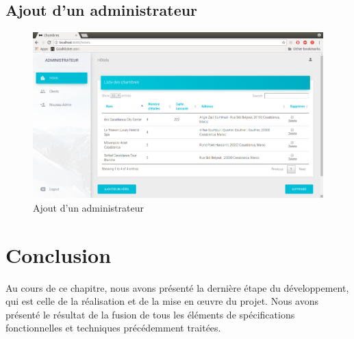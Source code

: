 \documentclass[12pt,a4paper]{report}
\begin{document}
	\subsection{Ajout d'un administrateur}
	\begin{figure}[!hbtp]
		\centering
		\includegraphics[scale=0.3]{./graphics/hotels.png}
		\caption{Ajout d'un administrateur}
		\end{figure}
		\newpage
	
	\section{Conclusion}
Au cours de ce chapitre, nous avons présenté la dernière étape du développement, qui est
celle de la réalisation et de la mise en œuvre du projet. Nous avons présenté le résultat de la fusion
de tous les éléments de spécifications fonctionnelles et techniques précédemment traitées.




\end{document}
